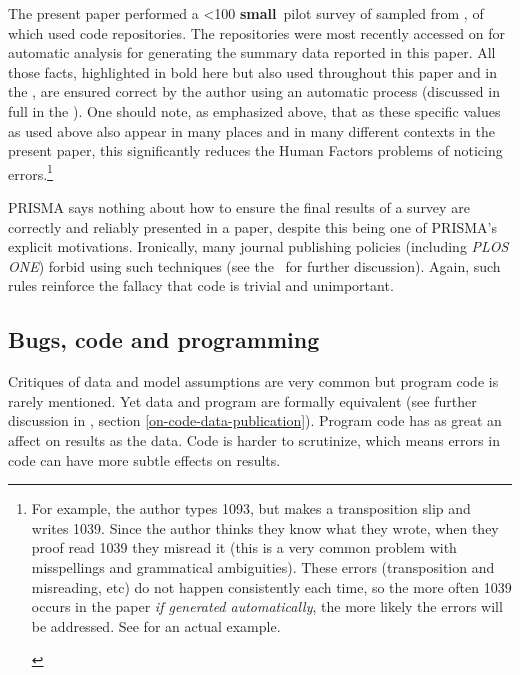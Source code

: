 \begin{change}
The present paper performed a \ifnum \dataN<100 \textbf{small}\fi\ pilot survey of \textbf{} sampled from \textbf{}, \textbf{\the\counthasDataRepository} of which used code repositories. The repositories were most recently accessed on \textbf{\clonedate} for automatic analysis for generating the summary data reported in this paper. All those facts, highlighted in bold here but also used throughout this paper and in the \supplement, are ensured correct by the author using an automatic process (discussed in full in the \supplement). One should note, as emphasized above, that as these specific values as used above also appear in many places and in many different contexts in the present paper, this significantly reduces the Human Factors problems of noticing errors.\footnote{\begin{change}For example, the author types 1093, but makes a transposition slip and writes 1039. Since the author thinks they know what they wrote, when they proof read 1039 they misread it (this is a very common problem with misspellings and grammatical ambiguities). These errors (transposition and misreading, etc) do not happen consistently each time, so the more often 1039 occurs in the paper \emph{if generated automatically}, the more likely the errors will be addressed. See \cite{enigma} for an actual example.\end{change}}

PRISMA says nothing about how to ensure the final results of a survey are correctly and reliably presented in a paper, despite this being one of PRISMA's explicit motivations. Ironically, many journal publishing policies (including \emph{PLOS ONE}\/) forbid using such techniques (see the \supplement\ for further discussion). Again, such rules reinforce the fallacy that code is trivial and unimportant. 
\end{change}

\subsection{Bugs, code and programming}\label{knowledge}
Critiques of data and model assumptions are very common \cite{critiques,diagnosis-reviews} but program code is rarely mentioned. Yet data and program are formally equivalent (see further discussion in \supplement, section \ref{on-code-data-publication}). Program code has as great an affect on results as the data. Code is harder to scrutinize, which means errors in code can have more subtle effects on results.

